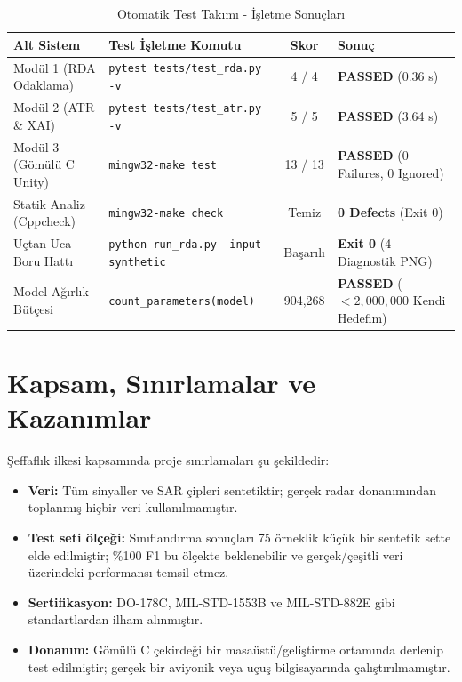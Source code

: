 \documentclass[11pt,a4paper]{article}
\begin{document}
\begin{table}[htbp]
\centering
\small
\caption{Otomatik Test Takımı - İşletme Sonuçları}
\label{tab:verification_summary}
\begin{tabularx}{\textwidth}{llcX}
\toprule
\textbf{Alt Sistem} & \textbf{Test İşletme Komutu} & \textbf{Skor} & \textbf{Sonuç} \\
\midrule
Modül 1 (RDA Odaklama) & \texttt{pytest tests/test\_rda.py -v} & 4 / 4 & \textcolor{successgreen}{\textbf{PASSED}} (0.36 s) \\
Modül 2 (ATR \& XAI) & \texttt{pytest tests/test\_atr.py -v} & 5 / 5 & \textcolor{successgreen}{\textbf{PASSED}} (3.64 s) \\
Modül 3 (Gömülü C Unity) & \texttt{mingw32-make test} & 13 / 13 & \textcolor{successgreen}{\textbf{PASSED}} (0 Failures, 0 Ignored) \\
Statik Analiz (Cppcheck) & \texttt{mingw32-make check} & Temiz & \textcolor{successgreen}{\textbf{0 Defects}} (Exit 0) \\
Uçtan Uca Boru Hattı & \texttt{python run\_rda.py -input synthetic} & Başarılı & \textcolor{successgreen}{\textbf{Exit 0}} (4 Diagnostik PNG) \\
Model Ağırlık Bütçesi & \texttt{count\_parameters(model)} & 904{,}268 & \textcolor{successgreen}{\textbf{PASSED}} ($< 2{,}000{,}000$ Kendi Hedefim) \\
\bottomrule
\end{tabularx}
\end{table}

\section{Kapsam, Sınırlamalar ve Kazanımlar}

Şeffaflık ilkesi kapsamında proje sınırlamaları şu şekildedir:
\begin{itemize}
    \item \textbf{Veri:} Tüm sinyaller ve SAR çipleri sentetiktir; gerçek radar donanımından toplanmış hiçbir veri kullanılmamıştır.
    \item \textbf{Test seti ölçeği:} Sınıflandırma sonuçları 75 örneklik küçük bir sentetik sette elde edilmiştir; \%100 F1 bu ölçekte beklenebilir ve gerçek/çeşitli veri üzerindeki performansı temsil etmez.
    \item \textbf{Sertifikasyon:} DO-178C, MIL-STD-1553B ve MIL-STD-882E gibi standartlardan ilham alınmıştır.
    \item \textbf{Donanım:} Gömülü C çekirdeği bir masaüstü/geliştirme ortamında derlenip test edilmiştir; gerçek bir aviyonik veya uçuş bilgisayarında çalıştırılmamıştır.
\end{itemize}
\end{document}

